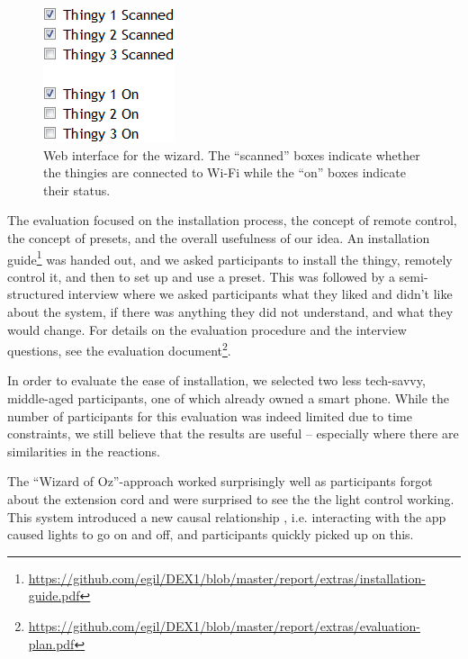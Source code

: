 \documentclass{ubicomp2012}
\begin{document}
\begin{figure}[th]
\begin{center}
\includegraphics[width=0.4\columnwidth]{figures/prototype-wizard-interface.png}
\end{center}
\caption{Web interface for the wizard. The ``scanned'' boxes indicate whether the thingies are connected to Wi-Fi while the ``on'' boxes indicate their status.}
\label{fig:wizardInterface}
\end{figure}

The evaluation focused on the installation process, the concept of remote control, the concept of presets, and the overall usefulness of our idea. An installation guide\footnote{\url{https://github.com/egil/DEX1/blob/master/report/extras/installation-guide.pdf}} was handed out, and we asked participants to install the thingy, remotely control it, and then to set up and use a preset. This was followed by a semi-structured interview where we asked participants what they liked and didn't like about the system, if there was anything they did not understand, and what they would change. For details on the evaluation procedure and the interview questions, see the evaluation document\footnote{\url{https://github.com/egil/DEX1/blob/master/report/extras/evaluation-plan.pdf}}.

 In order to evaluate the ease of installation, we selected two less tech-savvy, middle-aged participants, one of which already owned a smart phone. While the number of participants for this evaluation was indeed limited due to time constraints, we still believe that the results are useful -- especially where there are similarities in the reactions.

The ``Wizard of Oz''-approach worked surprisingly well as participants forgot about the extension cord and were surprised to see the the light control working. This system introduced a new causal relationship \cite{causalReasoning}, i.e. interacting with the app caused lights to go on and off, and participants quickly picked up on this.
\end{document}
